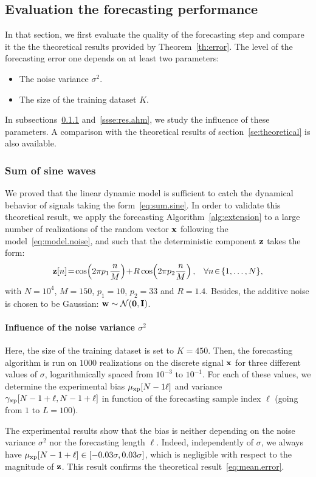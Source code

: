 \subsection{Evaluation the forecasting performance}
In that section, we first evaluate the quality of the forecasting step and compare it the the theoretical results provided by Theorem~\ref{th:error}. The level of the forecasting error one depends on at least two parameters:
\begin{itemize}
\item The noise variance $\sigma^2$.
\item The size of the training dataset $K$. 
\end{itemize}
In subsections~\ref{ssse:res.sine} and~\ref{ssse:res.ahm}, we study the influence of these parameters. A comparison with the theoretical results of section~\ref{se:theoretical} is also available.

\subsubsection{Sum of sine waves}
\label{ssse:res.sine}
We proved that the linear dynamic model is sufficient to catch the dynamical behavior of signals taking the form~\eqref{eq:sum.sine}. In order to validate this theoretical result, we apply the forecasting Algorithm~\ref{alg:extension} to a large number of realizations of the random vector ${\mathbf x}$ following the model~\eqref{eq:model.noise}, and such that the deterministic component ${\mathbf z}$ takes the form:
\[
\bz[n]\! =\!\cos\!\left(2\pi p_1 \dfrac{n}{M} \right)\! +\! R\cos\!\left(2\pi p_2 \dfrac{n}{M} \right),\quad \!\forall n\!\in\!\{1,\ldots,N\},
\]
with $N=10^4$, $M=150$, $p_1=10$, $p_2=33$ and $R=1.4$. Besides, the additive noise is chosen to be Gaussian: ${\mathbf w}\sim{\mathcal N}(\boldsymbol{0},{\mathbf I})$.

\paragraph{Influence of the noise variance $\sigma^2$} Here, the size of the training dataset is set to $K=450$. Then, the forecasting algorithm is run on $1000$ realizations on the discrete signal ${\mathbf x}$ for three different values of $\sigma$, logarithmically spaced from $10^{-3}$ to $10^{-1}$. For each of these values, we determine the experimental bias $\mu_{{\mathrm{xp}}}[N-1\ell]$ and variance $\gamma_{{\mathrm{xp}}}[N-1+\ell,N-1+\ell]$ in function of the forecasting sample index $\ell$ (going from $1$ to $L=100$).

The experimental results show that the bias is neither depending on the noise variance $\sigma^2$ nor the forecasting length $\ell$. Indeed, independently of $\sigma$, we always have $\mu_{{\mathrm{xp}}}[N-1+\ell]\in\left[-0.03\sigma,0.03\sigma\right]$, which is negligible with respect to the magnitude of ${\mathbf z}$. This result confirms the theoretical result~\eqref{eq:mean.error}. 

